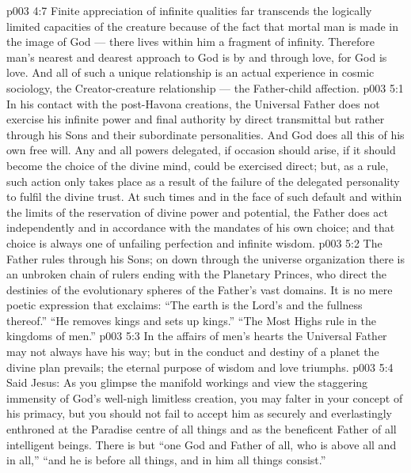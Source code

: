 \vs p003 4:7 Finite appreciation of infinite qualities far transcends the logically limited capacities of the creature because of the fact that mortal man is made in the image of God --- there lives within him a fragment of infinity. Therefore man’s nearest and dearest approach to God is by and through love, for God is love. And all of such a unique relationship is an actual experience in cosmic sociology, the Creator\hyp{}creature relationship --- the Father\hyp{}child affection.
\vs p003 5:1 In his contact with the post\hyp{}Havona creations, the Universal Father does not exercise his infinite power and final authority by direct transmittal but rather through his Sons and their subordinate personalities. And God does all this of his own free will. Any and all powers delegated, if occasion should arise, if it should become the choice of the divine mind, could be exercised direct; but, as a rule, such action only takes place as a result of the failure of the delegated personality to fulfil the divine trust. At such times and in the face of such default and within the limits of the reservation of divine power and potential, the Father does act independently and in accordance with the mandates of his own choice; and that choice is always one of unfailing perfection and infinite wisdom.
\vs p003 5:2 The Father rules through his Sons; on down through the universe organization there is an unbroken chain of rulers ending with the Planetary Princes, who direct the destinies of the evolutionary spheres of the Father’s vast domains. It is no mere poetic expression that exclaims: “The earth is the Lord’s and the fullness thereof.” “He removes kings and sets up kings.” “The Most Highs rule in the kingdoms of men.”
\vs p003 5:3 In the affairs of men’s hearts the Universal Father may not always have his way; but in the conduct and destiny of a planet the divine plan prevails; the eternal purpose of wisdom and love triumphs.
\vs p003 5:4 Said Jesus:  As you glimpse the manifold workings and view the staggering immensity of God’s well\hyp{}nigh limitless creation, you may falter in your concept of his primacy, but you should not fail to accept him as securely and everlastingly enthroned at the Paradise centre of all things and as the beneficent Father of all intelligent beings. There is but “one God and Father of all, who is above all and in all,” “and he is before all things, and in him all things consist.”
